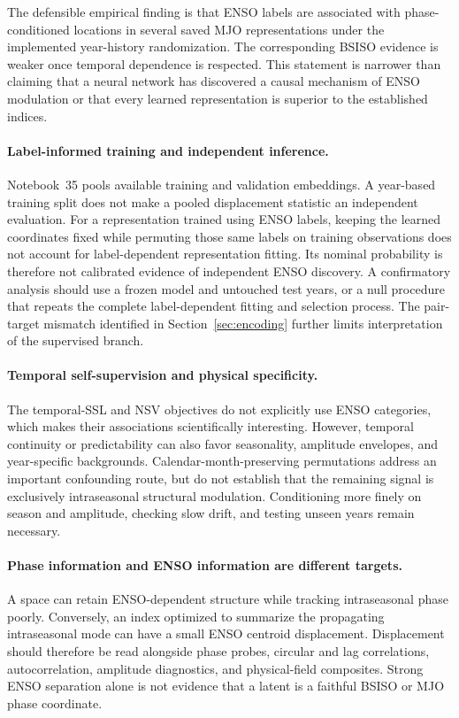 \documentclass[11pt]{article}
\begin{document}
The defensible empirical finding is that ENSO labels are associated with phase-conditioned locations in several saved MJO representations under the implemented year-history randomization. The corresponding BSISO evidence is weaker once temporal dependence is respected. This statement is narrower than claiming that a neural network has discovered a causal mechanism of ENSO modulation or that every learned representation is superior to the established indices.

\paragraph{Label-informed training and independent inference.}
Notebook~35 pools available training and validation embeddings. A year-based training split does not make a pooled displacement statistic an independent evaluation. For a representation trained using ENSO labels, keeping the learned coordinates fixed while permuting those same labels on training observations does not account for label-dependent representation fitting. Its nominal probability is therefore not calibrated evidence of independent ENSO discovery. A confirmatory analysis should use a frozen model and untouched test years, or a null procedure that repeats the complete label-dependent fitting and selection process. The pair-target mismatch identified in Section~\ref{sec:encoding} further limits interpretation of the supervised branch.

\paragraph{Temporal self-supervision and physical specificity.}
The temporal-SSL and NSV objectives do not explicitly use ENSO categories, which makes their associations scientifically interesting. However, temporal continuity or predictability can also favor seasonality, amplitude envelopes, and year-specific backgrounds. Calendar-month-preserving permutations address an important confounding route, but do not establish that the remaining signal is exclusively intraseasonal structural modulation. Conditioning more finely on season and amplitude, checking slow drift, and testing unseen years remain necessary.

\paragraph{Phase information and ENSO information are different targets.}
A space can retain ENSO-dependent structure while tracking intraseasonal phase poorly. Conversely, an index optimized to summarize the propagating intraseasonal mode can have a small ENSO centroid displacement. Displacement should therefore be read alongside phase probes, circular and lag correlations, autocorrelation, amplitude diagnostics, and physical-field composites. Strong ENSO separation alone is not evidence that a latent is a faithful BSISO or MJO phase coordinate.
\end{document}
